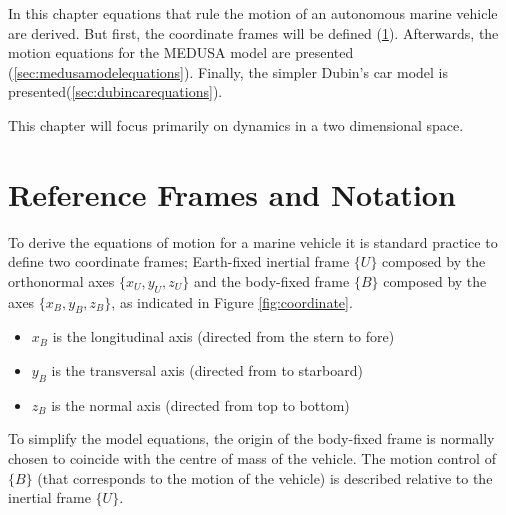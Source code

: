 \cleardoublepage
\label{chap:autonomousvehiclemodels}

\par In this chapter equations that rule the motion of an autonomous marine vehicle are derived. But first, the coordinate frames will be defined (\ref{sec:refframes}). Afterwards, the motion equations for the MEDUSA model are presented (\ref{sec:medusamodelequations}). Finally, the simpler Dubin's car model is presented(\ref{sec:dubincarequations}).
\par This chapter will focus primarily on dynamics in a two dimensional space.

\section{Reference Frames and Notation}
\label{sec:refframes}

\par To derive the equations of motion for a marine vehicle it is standard practice to define two coordinate frames; Earth-fixed inertial frame $\{U\}$ composed by the orthonormal axes $\{x_U,y_U,z_U\}$ and the body-fixed frame $\{B\}$ composed by the axes $\{x_B,y_B,z_B\}$, as indicated in Figure \ref{fig:coordinate}.

\begin{itemize}
    \item $x_B$ is the longitudinal axis (directed from the stern to fore)
    \item $y_B$ is the transversal axis (directed from to starboard)
    \item $z_B$ is the normal axis (directed from top to bottom)
\end{itemize}

\par To simplify the model equations, the origin of the body-fixed frame is normally chosen to coincide with the centre of mass of the vehicle. The motion control of $\{B\}$ (that corresponds to the motion of the vehicle) is described relative to the inertial frame $\{U\}$.


